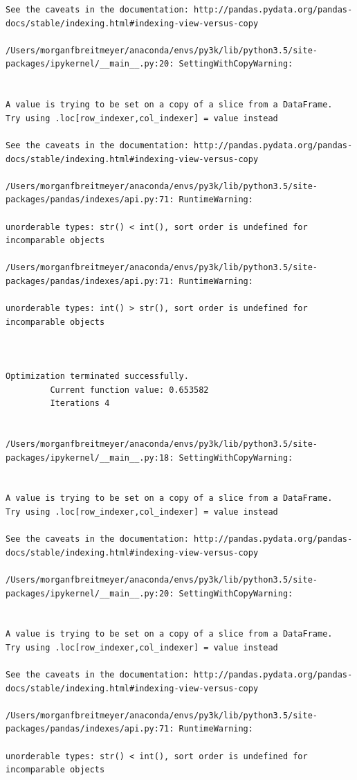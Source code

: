 \begin{lstlisting}
See the caveats in the documentation: http://pandas.pydata.org/pandas-docs/stable/indexing.html#indexing-view-versus-copy

/Users/morganfbreitmeyer/anaconda/envs/py3k/lib/python3.5/site-packages/ipykernel/__main__.py:20: SettingWithCopyWarning:


A value is trying to be set on a copy of a slice from a DataFrame.
Try using .loc[row_indexer,col_indexer] = value instead

See the caveats in the documentation: http://pandas.pydata.org/pandas-docs/stable/indexing.html#indexing-view-versus-copy

/Users/morganfbreitmeyer/anaconda/envs/py3k/lib/python3.5/site-packages/pandas/indexes/api.py:71: RuntimeWarning:

unorderable types: str() < int(), sort order is undefined for incomparable objects

/Users/morganfbreitmeyer/anaconda/envs/py3k/lib/python3.5/site-packages/pandas/indexes/api.py:71: RuntimeWarning:

unorderable types: int() > str(), sort order is undefined for incomparable objects



Optimization terminated successfully.
         Current function value: 0.653582
         Iterations 4


/Users/morganfbreitmeyer/anaconda/envs/py3k/lib/python3.5/site-packages/ipykernel/__main__.py:18: SettingWithCopyWarning:


A value is trying to be set on a copy of a slice from a DataFrame.
Try using .loc[row_indexer,col_indexer] = value instead

See the caveats in the documentation: http://pandas.pydata.org/pandas-docs/stable/indexing.html#indexing-view-versus-copy

/Users/morganfbreitmeyer/anaconda/envs/py3k/lib/python3.5/site-packages/ipykernel/__main__.py:20: SettingWithCopyWarning:


A value is trying to be set on a copy of a slice from a DataFrame.
Try using .loc[row_indexer,col_indexer] = value instead

See the caveats in the documentation: http://pandas.pydata.org/pandas-docs/stable/indexing.html#indexing-view-versus-copy

/Users/morganfbreitmeyer/anaconda/envs/py3k/lib/python3.5/site-packages/pandas/indexes/api.py:71: RuntimeWarning:

unorderable types: str() < int(), sort order is undefined for incomparable objects


\end{lstlisting}
